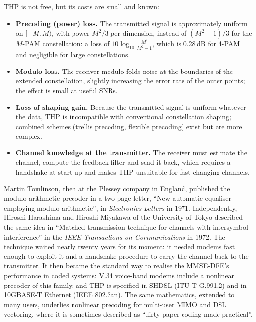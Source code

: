THP is not free, but its costs are small and known:
\begin{itemize}
\item \textbf{Precoding (power) loss.} The transmitted signal is approximately uniform on $[-M,M)$,
with power $M^2/3$ per dimension, instead of $(M^2-1)/3$ for the $M$-PAM constellation: a loss of
$10\log_{10}\frac{M^2}{M^2-1}$, which is 0.28\,dB for 4-PAM and negligible for large constellations.
\item \textbf{Modulo loss.} The receiver modulo folds noise at the boundaries of the extended
constellation, slightly increasing the error rate of the outer points; the effect is small at useful
SNRs.
\item \textbf{Loss of shaping gain.} Because the transmitted signal is uniform whatever the data,
THP is incompatible with conventional constellation shaping; combined schemes (trellis precoding, flexible
precoding) exist but are more complex.
\item \textbf{Channel knowledge at the transmitter.} The receiver must estimate the channel,
compute the feedback filter and send it back, which requires a handshake at start-up and makes THP
unsuitable for fast-changing channels.
\end{itemize}

\begin{history}
Martin Tomlinson, then at the Plessey company in England, published the modulo-arithmetic precoder
in a two-page letter, ``New automatic equaliser employing modulo arithmetic'', in \emph{Electronics
Letters} in 1971. Independently, Hiroshi Harashima and Hiroshi Miyakawa of the University of Tokyo
described the same idea in ``Matched-transmission technique for channels with intersymbol
interference'' in the \emph{IEEE Transactions on Communications} in 1972. The technique waited nearly
twenty years for its moment: it needed modems fast enough to exploit it and a handshake procedure to
carry the channel back to the transmitter. It then became the standard way to realise the MMSE-DFE's
performance in coded systems: V.34 voice-band modems include a nonlinear precoder of this family, and
THP is specified in SHDSL (ITU-T G.991.2) and in 10GBASE-T Ethernet (IEEE 802.3an). The same
mathematics, extended to many users, underlies nonlinear precoding for multi-user MIMO and DSL
vectoring, where it is sometimes described as ``dirty-paper coding made practical''.
\end{history}


